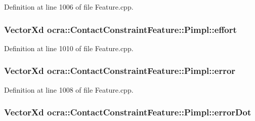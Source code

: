 Definition at line 1006 of file Feature.\+cpp.

\subsubsection[{\texorpdfstring{effort}{effort}}]{\setlength{\rightskip}{0pt plus 5cm}Vector\+Xd ocra\+::\+Contact\+Constraint\+Feature\+::\+Pimpl\+::effort}\hypertarget{structocra_1_1ContactConstraintFeature_1_1Pimpl_af9482cf46b3e6e4e44c3244b63d899c5}{}\label{structocra_1_1ContactConstraintFeature_1_1Pimpl_af9482cf46b3e6e4e44c3244b63d899c5}


Definition at line 1010 of file Feature.\+cpp.

\subsubsection[{\texorpdfstring{error}{error}}]{\setlength{\rightskip}{0pt plus 5cm}Vector\+Xd ocra\+::\+Contact\+Constraint\+Feature\+::\+Pimpl\+::error}\hypertarget{structocra_1_1ContactConstraintFeature_1_1Pimpl_a00ed1a9962ef8b48ed816d4f3f39394b}{}\label{structocra_1_1ContactConstraintFeature_1_1Pimpl_a00ed1a9962ef8b48ed816d4f3f39394b}


Definition at line 1008 of file Feature.\+cpp.

\subsubsection[{\texorpdfstring{error\+Dot}{errorDot}}]{\setlength{\rightskip}{0pt plus 5cm}Vector\+Xd ocra\+::\+Contact\+Constraint\+Feature\+::\+Pimpl\+::error\+Dot}\hypertarget{structocra_1_1ContactConstraintFeature_1_1Pimpl_a43821a1f06ddd5af36588e84def45897}{}\label{structocra_1_1ContactConstraintFeature_1_1Pimpl_a43821a1f06ddd5af36588e84def45897}


